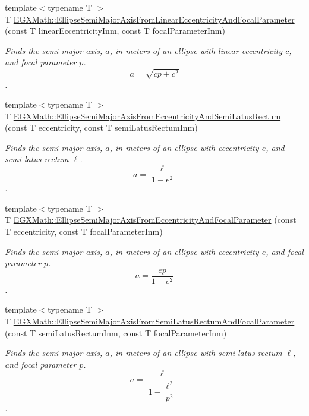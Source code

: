 \begin{DoxyCompactItemize}
{\footnotesize template$<$typename T $>$ }\\T \mbox{\hyperlink{group___e_g_x_math-_geometry-2_d-_ellipse-_semi_major_axis_gad77cbdb5c764cb11bc79a7373d0b6881}{E\+G\+X\+Math\+::\+Ellipse\+Semi\+Major\+Axis\+From\+Linear\+Eccentricity\+And\+Focal\+Parameter}} (const T linear\+Eccentricity\+Inm, const T focal\+Parameter\+Inm)
\begin{DoxyCompactList}\small\item\em Finds the semi-\/major axis, $a$, in meters of an ellipse with linear eccentricity $c$, and focal parameter $p$. \[ a=\sqrt{cp + c^2} \]. \end{DoxyCompactList}\item 
{\footnotesize template$<$typename T $>$ }\\T \mbox{\hyperlink{group___e_g_x_math-_geometry-2_d-_ellipse-_semi_major_axis_ga00e19efce15b74c6556cbd5650d7f699}{E\+G\+X\+Math\+::\+Ellipse\+Semi\+Major\+Axis\+From\+Eccentricity\+And\+Semi\+Latus\+Rectum}} (const T eccentricity, const T semi\+Latus\+Rectum\+Inm)
\begin{DoxyCompactList}\small\item\em Finds the semi-\/major axis, $a$, in meters of an ellipse with eccentricity $e$, and semi-\/latus rectum $\ell$. \[ a=\dfrac{\ell}{1 - e^2} \]. \end{DoxyCompactList}\item 
{\footnotesize template$<$typename T $>$ }\\T \mbox{\hyperlink{group___e_g_x_math-_geometry-2_d-_ellipse-_semi_major_axis_ga77845ca288672da90567f533679e7024}{E\+G\+X\+Math\+::\+Ellipse\+Semi\+Major\+Axis\+From\+Eccentricity\+And\+Focal\+Parameter}} (const T eccentricity, const T focal\+Parameter\+Inm)
\begin{DoxyCompactList}\small\item\em Finds the semi-\/major axis, $a$, in meters of an ellipse with eccentricity $e$, and focal parameter $p$. \[ a=\dfrac{ep}{1-e^2} \]. \end{DoxyCompactList}\item 
{\footnotesize template$<$typename T $>$ }\\T \mbox{\hyperlink{group___e_g_x_math-_geometry-2_d-_ellipse-_semi_major_axis_gaea152a91fc8eb6532f497e9d25f0477c}{E\+G\+X\+Math\+::\+Ellipse\+Semi\+Major\+Axis\+From\+Semi\+Latus\+Rectum\+And\+Focal\+Parameter}} (const T semi\+Latus\+Rectum\+Inm, const T focal\+Parameter\+Inm)
\begin{DoxyCompactList}\small\item\em Finds the semi-\/major axis, $a$, in meters of an ellipse with semi-\/latus rectum $\ell$, and focal parameter $p$. \[ a=\dfrac{\ell}{1-\dfrac{\ell^2}{p^2}} \]. \end{DoxyCompactList}\end{DoxyCompactItemize}


